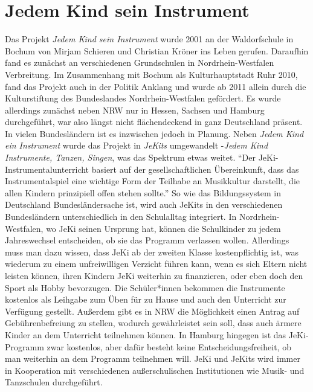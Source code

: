 \section{Jedem Kind sein Instrument}

Das Projekt \emph{Jedem Kind sein Instrument} wurde 2001 an der Waldorfschule
in Bochum von Mirjam Schieren und Christian Kröner ins Leben gerufen. Daraufhin
fand es zunächst an verschiedenen Grundschulen in Nordrhein-Westfalen
Verbreitung. Im Zusammenhang mit Bochum als Kulturhauptstadt Ruhr 2010, fand das
Projekt auch in der Politik Anklang und wurde ab 2011 allein durch die
Kulturstiftung des Bundeslandes Nordrhein-Westfalen gefördert. Es wurde
allerdings zunächst neben NRW nur in Hessen, Sachsen und Hamburg durchgeführt,
war also längst nicht flächendeckend in ganz Deutschland präsent. In vielen
Bundesländern ist es inzwischen jedoch in Planung. Neben \emph{Jedem Kind ein Instrument}
wurde das Projekt in \emph{JeKits} umgewandelt -\emph{Jedem Kind Instrumente, Tanzen,
Singen}, was das Spektrum etwas weitet. \enquote{Der JeKi-Instrumentalunterricht
basiert auf der gesellschaftlichen Übereinkunft, dass das Instrumentalspiel eine
wichtige Form der Teilhabe an Musikkultur darstellt, die allen Kindern
prinzipiell offen stehen sollte.}\autocite[94]{krupp_schleussner:jeki} So wie
das Bildungssystem in Deutschland Bundesländersache ist, wird auch JeKits in den
verschiedenen Bundesländern unterschiedlich in den Schulalltag integriert. In
Nordrhein-Westfalen, wo JeKi seinen Ursprung hat, können die Schulkinder zu
jedem Jahreswechsel entscheiden, ob sie das Programm verlassen wollen.
\autocite[95]{krupp_schleussner:jeki} Allerdings muss man dazu wissen, dass JeKi
ab der zweiten Klasse kostenpflichtig ist, was wiederum zu einem unfreiwilligen
Verzicht führen kann, wenn es sich Eltern nicht leisten können, ihren Kindern
JeKi weiterhin zu finanzieren, oder eben doch den Sport als Hobby bevorzugen.
Die Schüler*innen bekommen die Instrumente kostenlos als Leihgabe
zum Üben für zu Hause und auch den Unterricht zur Verfügung gestellt. Außerdem
gibt es in NRW die Möglichkeit einen Antrag auf Gebührenbefreiung zu stellen,
wodurch gewährleistet sein soll, dass auch ärmere Kinder an
dem Unterricht teilnehmen können. In Hamburg hingegen ist das
JeKi-Programm zwar kostenlos, aber dafür besteht keine Entscheidungsfreiheit, ob
man weiterhin an dem Programm teilnehmen will.
\autocite[95]{krupp_schleussner:jeki}
JeKi und JeKits wird immer in Kooperation mit verschiedenen außerschulischen
Institutionen wie Musik- und Tanzschulen durchgeführt.

